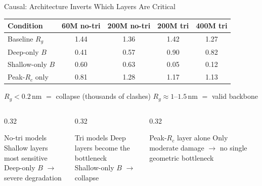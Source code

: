\documentclass[10pt, aspectratio=169]{beamer}
\begin{document}
\begin{frame}{Causal: Architecture Inverts Which Layers Are Critical}

\centering
{\small
\begin{tabular}{lcccc}
    \toprule
    Condition & 60M no-tri & 200M no-tri & 200M tri & 400M tri \\
    \midrule
    Baseline $R_g$ & 1.44 & 1.36 & 1.42 & 1.27 \\
    \midrule
    \textcolor{red!70!black}{Deep-only $B$} & \textcolor{red!70!black}{0.41} & \textcolor{red!70!black}{0.57} & 0.90 & 0.82 \\
    Shallow-only $B$ & 0.60 & 0.63 & \textcolor{red!70!black}{0.05} & \textcolor{red!70!black}{0.12} \\
    \midrule
    Peak-$R_c$ only & 0.81 & 1.28 & 1.17 & 1.13 \\
    \bottomrule
\end{tabular}}

\smallskip
{\footnotesize $R_g < 0.2$\,nm $=$ collapse (thousands of clashes) \qquad $R_g \approx 1$--$1.5$\,nm $=$ valid backbone}

\medskip
\begin{columns}[T]
\begin{column}{0.32\textwidth}
\begin{block}{No-tri models}
Shallow layers most sensitive\\
Deep-only $B$ $\to$ severe degradation
\end{block}
\end{column}

\begin{column}{0.32\textwidth}
\begin{block}{Tri models}
Deep layers become the bottleneck\\
Shallow-only $B$ $\to$ collapse
\end{block}
\end{column}

\begin{column}{0.32\textwidth}
\begin{block}{Peak-$R_c$ layer alone}
Only moderate damage $\to$ no single geometric bottleneck
\end{block}
\end{column}
\end{columns}
\end{frame}
\end{document}
